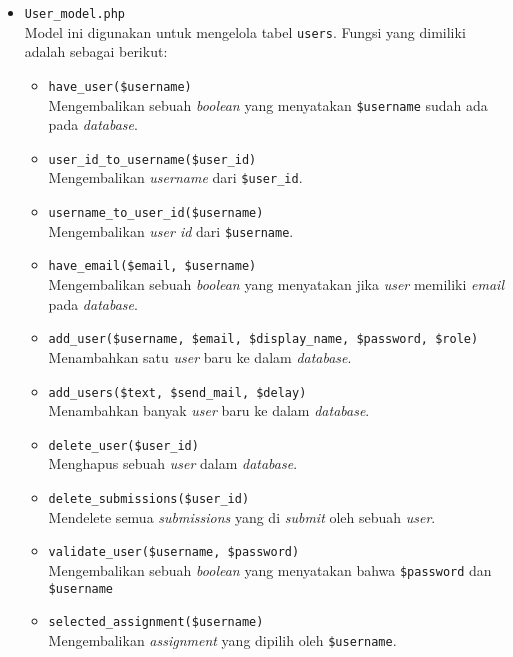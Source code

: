 \begin{itemize}
	\item \verb|User_model.php| \\
	      Model ini digunakan untuk mengelola tabel \verb|users|. Fungsi yang dimiliki adalah sebagai berikut:

	      \begin{itemize}
		      \item \verb|have_user($username)| \\
		            Mengembalikan sebuah \textit{boolean} yang menyatakan \verb|$username| sudah ada pada \textit{database}.
		      \item \verb|user_id_to_username($user_id)| \\
		            Mengembalikan \textit{username} dari \verb|$user_id|.
		      \item \verb|username_to_user_id($username)| \\
		            Mengembalikan \textit{user id} dari \verb|$username|.
		      \item \verb|have_email($email, $username)| \\
		            Mengembalikan sebuah \textit{boolean} yang menyatakan jika \textit{user} memiliki \textit{email} pada \textit{database}.
		      \item \verb|add_user($username, $email, $display_name, $password, $role)| \\
		            Menambahkan satu \textit{user} baru ke dalam \textit{database}.
		      \item \verb|add_users($text, $send_mail, $delay)| \\
		            Menambahkan banyak \textit{user} baru ke dalam \textit{database}.
		      \item \verb|delete_user($user_id)| \\
		            Menghapus sebuah \textit{user} dalam \textit{database}.
		      \item \verb|delete_submissions($user_id)| \\
		            Mendelete semua \textit{submissions} yang di \textit{submit} oleh sebuah \textit{user}.
		      \item \verb|validate_user($username, $password)| \\
		            Mengembalikan sebuah \textit{boolean} yang menyatakan bahwa \verb|$password| dan \verb|$username|
		      \item \verb|selected_assignment($username)| \\
		            Mengembalikan \textit{assignment} yang dipilih oleh \verb|$username|.

\end{itemize}
\end{itemize}
